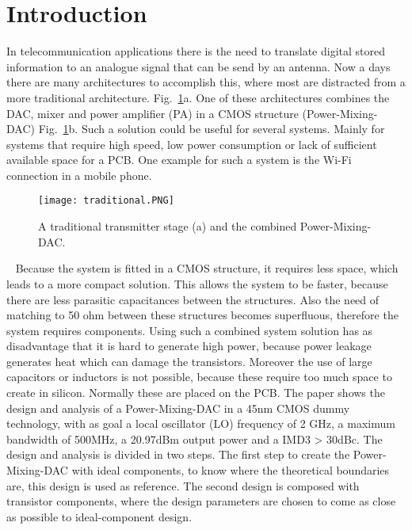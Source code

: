 \section{Introduction} \label{sec:introduction}
In telecommunication applications there is the need to translate digital stored information to an analogue signal that can be send by an antenna. Now a days there are many architectures to accomplish this, where most are distracted from a more traditional architecture. Fig.~\ref{fig:traditional}a. One of these architectures combines the DAC, mixer and power amplifier (PA) in a CMOS structure (Power-Mixing-DAC) Fig.~\ref{fig:traditional}b. Such a solution could be useful for several systems. Mainly for systems that require high speed, low power consumption or lack of sufficient available space for a PCB. One example for such a system is the Wi-Fi connection in a mobile phone.
\begin{figure}[h]
\texttt{[image: traditional.PNG]}
\caption{A traditional transmitter stage (a) and the combined Power-Mixing-DAC.}
\label{fig:traditional}
\end{figure} ~\cite{powerdac}
Because the system is fitted in a CMOS structure, it requires less space, which leads to a more compact solution. This allows the system to be faster, because there are less parasitic capacitances between the structures. Also the need of matching to 50 ohm between these structures becomes superfluous, therefore the system requires components. Using such a combined system solution has as disadvantage that it is hard to generate high power, because power leakage generates heat which can damage the transistors. Moreover the use of large capacitors or inductors is not possible, because these require too much space to create in silicon. Normally these are placed on the PCB.
The paper shows the design and analysis of a Power-Mixing-DAC in a 45nm CMOS dummy technology, with as goal a local oscillator (LO) frequency of 2 GHz, a maximum bandwidth of 500MHz, a 20.97dBm output power and a IMD3 > 30dBc. The design and analysis is divided in two steps. The first step to create the Power-Mixing-DAC with ideal components, to know where the theoretical boundaries are, this design is used as reference. The second design is composed with transistor components, where the design parameters are chosen to come as close as possible to ideal-component design.  



